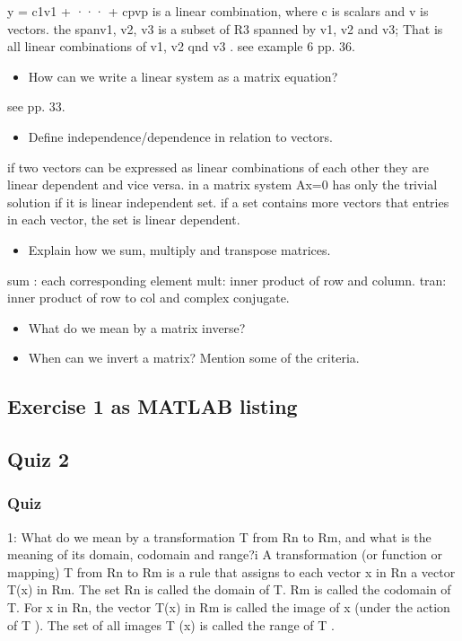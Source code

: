     y = c1v1 + ··· + cpvp is a linear combination, where c is scalars and v is vectors.
    the span{v1, v2, v3} is a subset of R3 spanned by v1, v2 and v3; That is all linear combinations of v1, v2 qnd v3
    . see example 6 pp. 36.
\begin{itemize}
    \item How can we write a linear system as a matrix equation?
\end{itemize}
    see pp. 33.
\begin{itemize}
    \item Define independence/dependence in relation to vectors. 
\end{itemize}
    if two vectors can be expressed as linear combinations of each other they are linear dependent and vice versa.
    in a matrix system Ax=0 has only the trivial solution if it is linear independent set.
    if a set contains more vectors that entries in each vector, the set is linear dependent.
\begin{itemize}
    \item Explain how we sum, multiply and transpose matrices.
\end{itemize}
    sum : each corresponding element
    mult: inner product of row and column.
    tran: inner product of row to col and complex conjugate.
\begin{itemize}
    \item What do we mean by a matrix inverse?
    \item When can we invert a matrix? Mention some of the criteria.
\end{itemize}

\subsection{Exercise 1 as MATLAB listing}
\label{sec:Exercise 1 as MATLAB listing}


\subsection{Quiz 2}
\label{sec:Quiz_1}

\subsubsection{Quiz} 1: What do we mean by a transformation T from Rn to Rm, and what is the meaning of its domain, codomain and range?i
        A transformation (or function or mapping) T from Rn to Rm is a rule that assigns to each vector x in Rn 
        a vector T(x) in Rm. 
        The set Rn is called the domain of T.
        Rm is called the codomain of T.
        For x in Rn, the vector T(x) in Rm is called the image of x (under the action of T ). 
        The set of all images T (x) is called the range of T .

